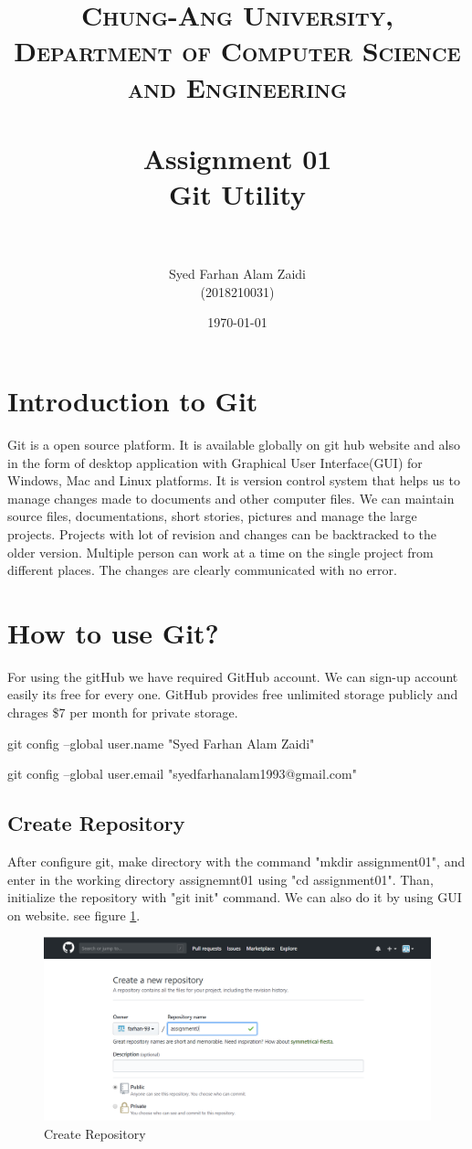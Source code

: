 \documentclass[paper=a4, fontsize=12pt]{scrartcl}
\title{	
\normalfont \normalsize 
\textsc{Chung-Ang University, Department of Computer Science and Engineering} \\ [25pt] %
\horrule{0.5pt} \\[0.4cm] %
\huge Assignment 01 \\
Git Utility\\  %
\horrule{1pt} \\[0.5cm] %
}
\author{Syed Farhan Alam Zaidi \\ (2018210031)} %
\date{\normalsize\today} %
\numberwithin{equation}{section} %
\numberwithin{figure}{section} %
\numberwithin{table}{section} %
\begin{document}
\maketitle %


\section{Introduction to Git}
\par Git is a open source platform. It is available globally on git hub website and also in the form of desktop application with Graphical User Interface(GUI) for Windows, Mac and Linux platforms.  It is version control system that helps us to manage changes made to documents and other computer files. We can maintain source files, documentations, short stories, pictures and manage the large projects. Projects with lot of revision and changes can be backtracked to the older version. Multiple person can work at a time on the single project from different places.  The changes are clearly communicated with no error.

\section{How to use Git?}
\par For using the gitHub we have required GitHub account. We can sign-up account easily its free for every one. GitHub provides free unlimited storage publicly and chrages \$7 per month for private storage.  

   \par git config --global user.name "Syed Farhan Alam Zaidi"
   \par  git config --global user.email "syedfarhanalam1993@gmail.com"

\subsection{Create Repository}
\par After configure git, make directory with the command "mkdir assignment01", and enter in the working directory assignemnt01 using "cd assignment01". Than, initialize the repository with "git init" command. We can also do it by using GUI on website. see figure \ref{crepo}.

\begin{figure}
\includegraphics[width=\linewidth]{createrepository.PNG}
\caption{Create Repository}
\label{crepo}
\end{figure}
\end{document}
